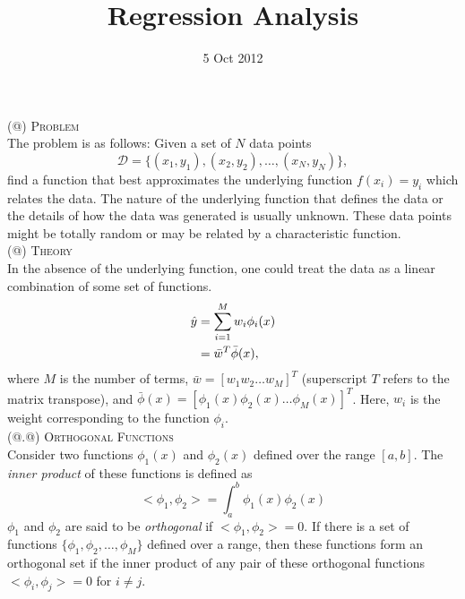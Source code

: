 \documentclass[a4paper,12pt]{article}
\title{Regression Analysis}
\author{}
\date{5 Oct 2012}
\makeatletter
\newcommand*{\rom}[1]{\expandafter\@slowromancap\romannumeral #1@}
\makeatother
\begin{document}
\maketitle

\noindent (\rom{1}) \textsc{Problem} \\
\hspace*{5mm} The problem is as follows: Given a set of $N$ data points \[\mathcal{D}=\{(x_1,y_1),(x_2,y_2),\ldots,(x_N,y_N)\},\] find a function that best approximates the underlying function $f(x_i) = y_i$ which relates the data. The nature of the underlying function that defines the data or the details of how the data was generated is usually unknown. These data points might be totally random or may be related by a characteristic function. \\

\noindent (\rom{2}) \textsc{Theory} \\
\hspace*{5mm} In the absence of the underlying function, one could treat the data as a linear combination of some set of functions.
\begin{align}
\hat{y} &=  \sum_{i=1}^M w_i \phi_i(x) \notag\\
  &=  \bar{w}^T \bar{\phi}(x), \label{linear_regression} 
\end{align}
where $M$ is the number of terms, $\bar{w} = [w_1 w_2 \ldots w_M]^T$ (superscript $T$ refers to the matrix transpose), and $\bar{\phi}(x) = [\phi_1(x) \phi_2(x) \ldots \phi_M(x)]^T$. Here, $w_i$ is the weight corresponding to the function $\phi_i$. \\

\noindent (\rom{2}.\rom{1}) \textsc{Orthogonal Functions} \\
\hspace*{5mm} Consider two functions $\phi_1(x)$ and $\phi_2(x)$ defined over the range $[a,b]$. The \textit{inner product} of these functions is defined as
\[ <\phi_1,\phi_2> = \int_{a}^{b} \phi_1(x) \phi_2(x) \]
$\phi_1$ and $\phi_2$ are said to be \textit{orthogonal} if $<\phi_1,\phi_2> = 0$. If there is a set of functions $\{\phi_1,\phi_2,\ldots,\phi_M\}$ defined over a range, then these functions form an orthogonal set if the inner product of any pair of these orthogonal functions $<\phi_i,\phi_j> = 0$ for $i \neq j$. \\
\end{document}

